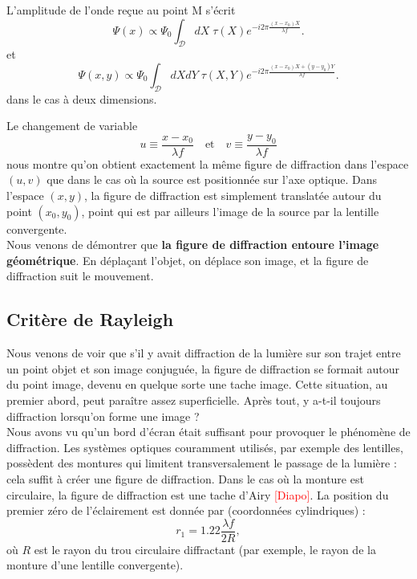 \documentclass[11pt,a4paper]{report}
\begin{document}
L'amplitude de l'onde reçue au point M s'écrit
\begin{equation}
	\Psi(x) \propto \Psi_0 \int_\mathcal{D} dX\; \tau(X) \displaystyle{e^{-i2\pi\frac{(x-x_0)X}{\lambda f}}}.
\end{equation}
et
\begin{equation}
	\Psi(x,y) \propto \Psi_0 \int_\mathcal{D} dXdY\; \tau(X,Y) \displaystyle{e^{-i2\pi\frac{(x-x_0)X + (y-y_0)Y}{\lambda f}}}.
\end{equation}
dans le cas à deux dimensions.

Le changement de variable
\begin{equation}
	u \equiv \frac{x - x_0}{\lambda f} \quad\text{et}\quad v \equiv \frac{y - y_0}{\lambda f}
\end{equation}
nous montre qu'on obtient exactement la même figure de diffraction dans l'espace $(u,v)$ que dans le cas où la source est positionnée sur l'axe optique. Dans l'espace $(x,y)$, la figure de diffraction est simplement translatée autour du point $(x_0,y_0)$, point qui est par ailleurs l'image de la source par la lentille convergente.\\

Nous venons de démontrer que \textbf{la figure de diffraction entoure l'image géométrique}. En déplaçant l'objet, on déplace son image, et la figure de diffraction suit le mouvement.

\subsection{Critère de Rayleigh}

Nous venons de voir que s'il y avait diffraction de la lumière sur son trajet entre un point objet et son image conjuguée, la figure de diffraction se formait autour du point image, devenu en quelque sorte une tache image. Cette situation, au premier abord, peut paraître assez superficielle. Après tout, y a-t-il toujours diffraction lorsqu'on forme une image ?\\

Nous avons vu qu'un bord d'écran était suffisant pour provoquer le phénomène de diffraction. Les systèmes optiques couramment utilisés, par exemple des lentilles, possèdent des montures qui limitent transversalement le passage de la lumière : cela suffit à créer une figure de diffraction. Dans le cas où la monture est circulaire, la figure de diffraction est une tache d'Airy \textcolor{red}{[Diapo]}. La position du premier zéro de l'éclairement est donnée par (coordonnées cylindriques) :
\begin{equation}
	r_1 = 1.22 \frac{\lambda f}{2R},
\end{equation}
où $R$ est le rayon du trou circulaire diffractant (par exemple, le rayon de la monture d'une lentille convergente).
\end{document}
